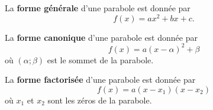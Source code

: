 \documentclass[a4paper,12pt]{report}
\begin{document}
    \begin{defi}
	    La {\bfseries forme générale} d'une parabole est donnée par \[f(x)=ax^2+bx+c.\]
    \end{defi}
    
    \begin{defi}
	    La {\bfseries forme canonique} d'une parabole est donnée par \[f(x)=a(x-\alpha)^2+\beta\] où $(\alpha;\beta)$ est le sommet de la parabole.
    \end{defi}

    \begin{defi}
	    La {\bfseries forme factorisée} d'une parabole est donnée par \[f(x)=a(x-x_1)(x-x_2)\] où $x_1$ et $x_2$ sont les zéros de la parabole.
    \end{defi}
    
\end{document}
